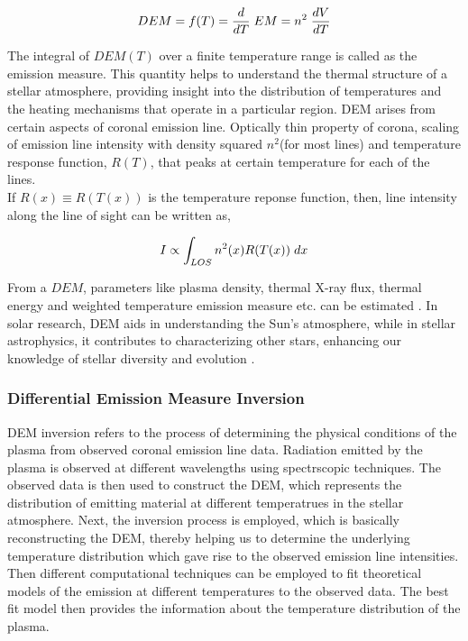 \vspace{-.75cm}
\everymath{\displaystyle}
\begin{center}
    \begin{equation*}
        DEM = f(T) = \frac{d}{dT}\hspace{0.1cm} EM = n^2 \hspace{0.1cm} \frac{dV}{dT}
    \end{equation*}
\end{center}

The integral of $DEM(T)$ over a finite temperature range is called as the emission measure. This quantity helps to understand the thermal structure of a stellar atmosphere, providing insight into the distribution of temperatures and the heating mechanisms that operate in a particular region. DEM arises from certain aspects of coronal emission line. Optically thin property of corona, scaling of emission line intensity with density squared $n^2$(for most lines) and temperature response function, $R(T)$, that peaks at certain temperature for each of the lines.\\

If $R(x) \equiv R(T(x))$ is the temperature reponse function, then, line intensity along the line of sight can be written as,

\vspace{-.75cm}
\begin{center}
    \begin{equation*}
        I \propto \int_{LOS} n^2(x) R(T(x)) \hspace{0.1cm} dx
    \end{equation*}
\end{center}


From a $DEM$, parameters like plasma density, thermal X-ray flux, thermal energy and weighted temperature emission measure etc. can be estimated \citep{Su2018-fq}. In solar research, DEM aids in understanding the Sun's atmosphere, while in stellar astrophysics, it contributes to characterizing other stars, enhancing our knowledge of stellar diversity and evolution \citep{Namekata2023-rq}.

\subsubsection{Differential Emission Measure Inversion}

DEM inversion refers to the process of determining the physical conditions of the plasma from observed coronal emission line data. Radiation emitted by the plasma is observed at different wavelengths using spectrscopic techniques. The observed data is then used to construct the DEM, which represents the distribution of emitting material at different temperatrues in the stellar atmosphere. Next, the inversion process is employed, which is basically reconstructing the DEM, thereby helping us to determine the underlying temperature distribution which gave rise to the observed emission line intensities. Then different computational techniques can be employed to fit theoretical models of the emission at different temperatures to the observed data. The best fit model then provides the information about the temperature distribution of the plasma.\\


